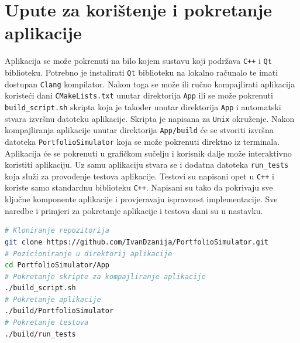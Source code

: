 \documentclass[zavrsnirad, upload]{fer}
\begin{document}
\chapter{Upute za korištenje i pokretanje aplikacije}
\label{sek:upute_za_koristenje}
Aplikacija se može pokrenuti na bilo kojem sustavu koji podržava
\texttt{C++} i \texttt{Qt} biblioteku. Potrebno je instalirati \texttt{Qt}
biblioteku na lokalno računalo te imati dostupan \texttt{Clang} kompilator.
Nakon toga se može ili ručno kompajlirati aplikacija koristeći dani
\texttt{CMakeLists.txt} unutar direktorija \texttt{App} ili se može
pokrenuti \texttt{build\_script.sh} skripta koja je također unutar direktorija
\texttt{App} i automatski stvara izvršnu datoteku aplikacije. Skripta je
napisana za \texttt{Unix} okruženje.
Nakon kompajliranja aplikacije unutar direktorija \texttt{App/build} će se
stvoriti izvršna datoteka \texttt{PortfolioSimulator} koja se može pokrenuti
direktno iz terminala. Aplikacija će se pokrenuti u grafičkom sučelju
i korisnik dalje može interaktivno koristiti aplikaciju. Uz samu aplikaciju
stvara se i dodatna datoteka \texttt{run\_tests} koja služi za provođenje
testova aplikacije. Testovi su napisani opet u \texttt{C++} i koriste samo standardnu
biblioteku \texttt{C++}. Napisani su tako da pokrivaju sve ključne
komponente aplikacije i provjeravaju ispravnost implementacije.
Sve naredbe i primjeri za pokretanje aplikacije i testova dani su u
nastavku.
\begin{lstlisting}[language=bash, caption={Primjeri naredbi za pokretanje aplikacije i testova}]
# Kloniranje repozitorija
git clone https://github.com/IvanDzanija/PortfolioSimulator.git
# Pozicioniranje u direktorij aplikacije
cd PortfolioSimulator/App
# Pokretanje skripte za kompajliranje aplikacije
./build_script.sh
# Pokretanje aplikacije
./build/PortfolioSimulator
# Pokretanje testova
./build/run_tests
\end{lstlisting}




\end{document}
